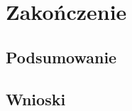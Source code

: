 \documentclass[12pt]{article}
\begin{document}
\section{Zakończenie}
\subsection{Podsumowanie}
\subsection{Wnioski}
\end{document}
